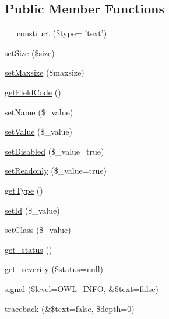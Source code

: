 \subsection*{Public Member Functions}
\begin{DoxyCompactItemize}
\item 
\hyperlink{classFormFieldText_a19f605d6195d340c6ddf9a298706b9cd}{\_\-\_\-construct} (\$type= 'text')
\item 
\hyperlink{classFormFieldText_a045b0853ed6e7777c7f3dddbadf31f5f}{setSize} (\$size)
\item 
\hyperlink{classFormFieldText_a91b6ce8a3476c4296fbe1b0802e70984}{setMaxsize} (\$maxsize)
\item 
\hyperlink{classFormFieldText_aebbf56aba1fd099619a360ac259633fa}{getFieldCode} ()
\item 
\hyperlink{classFormField_ad57e32bd53170af060e869b3b60f0ef7}{setName} (\$\_\-value)
\item 
\hyperlink{classFormField_a465ff61e290d82be96bb793c3a14b3e7}{setValue} (\$\_\-value)
\item 
\hyperlink{classFormField_a9fa2c828eaf98154edfaa2e755657117}{setDisabled} (\$\_\-value=true)
\item 
\hyperlink{classFormField_a6eabbb35d24b1698ea25b66ddfd88a64}{setReadonly} (\$\_\-value=true)
\item 
\hyperlink{classFormField_a1f64b737bccb6b2827f8c5665b9920c7}{getType} ()
\item 
\hyperlink{classBaseElement_a0c1ce3d1684ecb78960cf7a97278494e}{setId} (\$\_\-value)
\item 
\hyperlink{classBaseElement_af6597b30fa9798878f6290271043dfa2}{setClass} (\$\_\-value)
\item 
\hyperlink{class__OWL_a99ec771fa2c5c279f80152cc09e489a8}{get\_\-status} ()
\item 
\hyperlink{class__OWL_adf9509ef96858be7bdd9414c5ef129aa}{get\_\-severity} (\$status=null)
\item 
\hyperlink{class__OWL_a51ba4a16409acf2a2f61f286939091a5}{signal} (\$level=\hyperlink{owl_8severitycodes_8php_a139328861128689f2f4def6a399d9057}{OWL\_\-INFO}, \&\$text=false)
\item 
\hyperlink{class__OWL_aa29547995d6741b7d2b90c1d4ea99a13}{traceback} (\&\$text=false, \$depth=0)
\end{DoxyCompactItemize}
